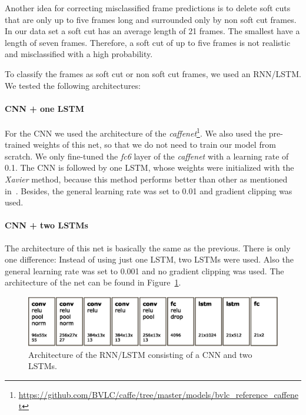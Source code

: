 Another idea for correcting misclassified frame predictions is to delete soft cuts that are only up to five frames long and surrounded only by non soft cut frames.
In our data set a soft cut has an average length of 21 frames.
The smallest have a length of seven frames.
Therefore, a soft cut of up to five frames is not realistic and misclassified with a high probability.

To classify the frames as soft cut or non soft cut frames, we used an RNN/LSTM.
We tested the following architectures:

\paragraph{CNN + one LSTM}
For the CNN we used the architecture of the \textit{caffenet}\footnote{\url{https://github.com/BVLC/caffe/tree/master/models/bvlc_reference_caffenet}}.
We also used the pre-trained weights of this net, so that we do not need to train our model from scratch.
We only fine-tuned the \textit{fc6} layer of the \textit{caffenet} with a learning rate of 0.1.
The CNN is followed by one LSTM, whose weights were initialized with the \textit{Xavier} method, because this method performs better than other as mentioned in~\cite{glorot2010understanding}.
Besides, the general learning rate was set to 0.01 and gradient clipping was used.

\paragraph{CNN + two LSTMs}
The architecture of this net is basically the same as the previous.
There is only one difference: Instead of using just one LSTM, two LSTMs were used.
Also the general learning rate was set to 0.001 and no gradient clipping was used.
The architecture of the net can be found in Figure~\ref{fig:net_architecture}.
\begin{figure}[!htb]
	\centering
	\includegraphics[scale=.5]{images/net_architecture.eps}
	\caption{Architecture of the RNN/LSTM consisting of a CNN and two LSTMs.}
	\label{fig:net_architecture}
\end{figure}

